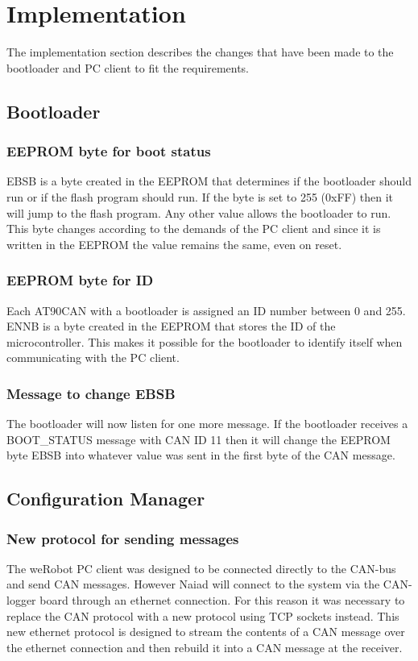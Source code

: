 \section{Implementation}\label{sec:implementation}
The implementation section describes the changes that have been made to the bootloader and PC client to fit the requirements.




\subsection{Bootloader}
\subsubsection{EEPROM byte for boot status}
EBSB is a byte created in the EEPROM that determines if the bootloader should run or if the flash program should run. If the byte is set to 255 (0xFF) then it will jump to the flash program. Any other value allows the bootloader to run. This byte changes according to the demands of the PC client and since it is written in the EEPROM the value remains the same, even on reset.

\subsubsection{EEPROM byte for ID}
Each AT90CAN with a bootloader is assigned an ID number between 0 and 255. ENNB is a byte created in the EEPROM that stores the ID of the microcontroller. This makes it possible for the bootloader to identify itself when communicating with the PC client.

\subsubsection{Message to change EBSB}
The bootloader will now listen for one more message. If the bootloader receives a BOOT\_STATUS message with CAN ID 11 then it will change the EEPROM byte EBSB into whatever value was sent in the first byte of the CAN message.

\subsection{Configuration Manager}

\subsubsection{New protocol for sending messages}
The weRobot PC client was designed to be connected directly to the CAN-bus and send CAN messages. However Naiad will connect to the system via the CAN-logger board through an ethernet connection. For this reason it was necessary to replace the CAN protocol with a new protocol using TCP sockets instead. This new ethernet protocol is designed to stream the contents of a CAN message over the ethernet connection and then rebuild it into a CAN message at the receiver. 


